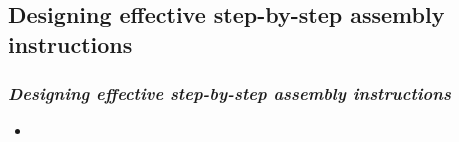 \subsection{Designing effective step-by-step assembly instructions}
\begin{frame}\frametitle{\emph{Designing effective step-by-step assembly instructions} \cite{882352}} 
\begin{itemize}
	\item 
\end{itemize}	
\end{frame}